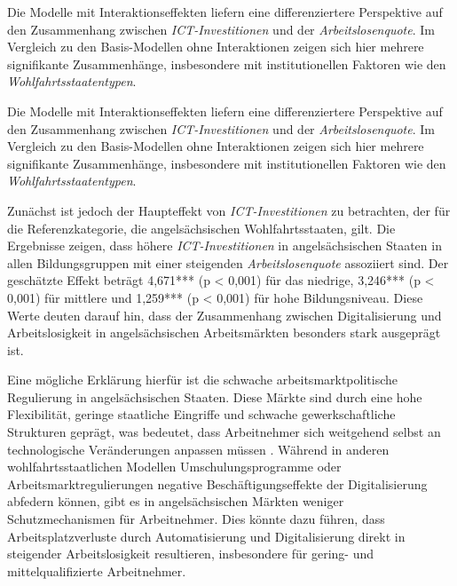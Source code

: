 

Die Modelle mit Interaktionseffekten liefern eine differenziertere Perspektive auf den 
Zusammenhang zwischen \textit{\ac{ICT}-Investitionen} und der \textit{Arbeitslosenquote}. Im 
Vergleich zu den Basis-Modellen ohne Interaktionen zeigen sich hier mehrere signifikante 
Zusammenhänge, insbesondere mit institutionellen Faktoren wie den \textit{Wohlfahrtsstaatentypen}.

Die Modelle mit Interaktionseffekten liefern eine differenziertere Perspektive auf den 
Zusammenhang zwischen \textit{\ac{ICT}-Investitionen} und der \textit{Arbeitslosenquote}. Im 
Vergleich zu den Basis-Modellen ohne Interaktionen zeigen sich hier mehrere signifikante 
Zusammenhänge, insbesondere mit institutionellen Faktoren wie den \textit{Wohlfahrtsstaatentypen}. 

Zunächst ist jedoch der Haupteffekt von \textit{\ac{ICT}-Investitionen} zu betrachten, der für 
die Referenzkategorie, die angelsächsischen Wohlfahrtsstaaten, gilt. Die Ergebnisse zeigen, dass 
höhere \textit{\ac{ICT}-Investitionen} in angelsächsischen Staaten in allen Bildungsgruppen mit 
einer steigenden \textit{Arbeitslosenquote} assoziiert sind. Der geschätzte Effekt beträgt 
4,671*** (p < 0,001) für das niedrige, 3,246*** (p < 0,001) für mittlere und 1,259*** (p < 0,001) 
für hohe Bildungsniveau. Diese Werte deuten darauf hin, dass der Zusammenhang zwischen 
Digitalisierung und Arbeitslosigkeit in angelsächsischen Arbeitsmärkten besonders stark 
ausgeprägt ist. 

Eine mögliche Erklärung hierfür ist die schwache arbeitsmarktpolitische Regulierung in 
angelsächsischen Staaten. Diese Märkte sind durch eine hohe Flexibilität, geringe staatliche 
Eingriffe und schwache gewerkschaftliche Strukturen geprägt, was bedeutet, dass Arbeitnehmer sich 
weitgehend selbst an technologische Veränderungen anpassen müssen 
\parencite[vgl.][S. 30]{hall2001varieties}. Während in anderen wohlfahrtsstaatlichen 
Modellen Umschulungsprogramme oder Arbeitsmarktregulierungen negative Beschäftigungseffekte der 
Digitalisierung abfedern können, gibt es in angelsächsischen Märkten weniger Schutzmechanismen 
für Arbeitnehmer. Dies könnte dazu führen, dass Arbeitsplatzverluste durch Automatisierung und 
Digitalisierung direkt in steigender Arbeitslosigkeit resultieren, insbesondere für gering- und 
mittelqualifizierte Arbeitnehmer.

